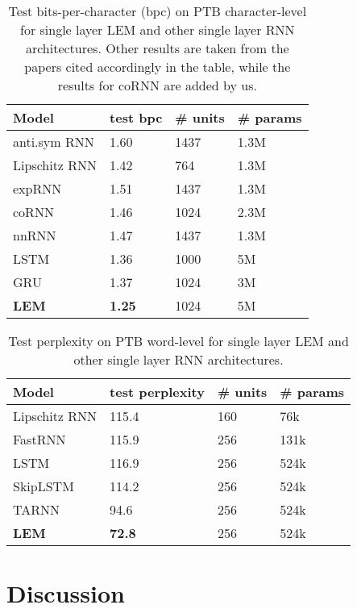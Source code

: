 \documentclass{article} \usepackage{iclr2022_conference,times}
\begin{document}
\begin{table}[ht!]
  \caption{Test bits-per-character (bpc) on PTB character-level for single layer LEM and other single layer RNN architectures. Other results are taken from the papers cited accordingly in the table, while the results for coRNN are added by us.}
  \label{tab:ptb_char}
  \centering
  \begin{tabular}{llll}
    \toprule
    \cmidrule(r){1-2}
    { Model} &  test bpc & \# units & \# params \\
    \midrule
anti.sym RNN \citep{lip_rnn}  & 1.60 & 1437 & 1.3M\\
Lipschitz RNN \citep{lip_rnn} & 1.42 & 764 & 1.3M \\
expRNN \citep{nnRNN} &  1.51 & 1437 & 1.3M \\
coRNN  & 1.46 & 1024 & 2.3M\\
nnRNN \citep{nnRNN}  &  1.47 & 1437 & 1.3M \\
LSTM \citep{zoneout} & 1.36  & 1000 & 5M \\
GRU \citep{tcn} & 1.37  & 1024 & 3M \\
\textbf{LEM} & \textbf{1.25} & 1024 & 5M \\
\bottomrule
\end{tabular}
\end{table}
\begin{table}[t!]
  \caption{Test perplexity on PTB word-level for single layer LEM and other single layer RNN architectures.}
  \label{tab:ptb_word}
  \centering
  \begin{tabular}{llll}
    \toprule
    \cmidrule(r){1-2}
    { Model} &  test perplexity & \# units & \# params \\
    \midrule
Lipschitz RNN \citep{lip_rnn} & 115.4 & 160 & 76k \\
FastRNN \citep{tarnn}  &  115.9 & 256 & 131k \\
LSTM \citep{tarnn} & 116.9 & 256 & 524k\\
SkipLSTM \citep{tarnn} &  114.2 & 256 & 524k \\
TARNN \citep{tarnn} & 94.6 & 256 & 524k \\
\textbf{LEM} & \textbf{72.8} & 256 & 524k \\
\bottomrule
\end{tabular}
\end{table}



\section{Discussion}
\label{sxn:discussion}
\end{document}
